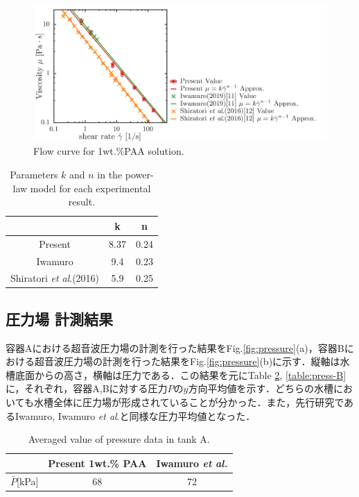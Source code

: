 \begin{figure}[ht]
    \centering
    \includegraphics[width=13cm,clip]{4-Results/PAA-viscosity.png}
    \caption{Flow curve for 1wt.\%PAA solution.}
    \label{fig:PAA-vis}
\end{figure}

\begin{table}[h]
    \centering
    \caption{Parameters $k$ and $n$ in the power-law model for each experimental result.}
    \label{table:power-law}
    \begin{tabular}{c|c|c} \hline
        & k & n \\ \hline \hline
        Present & 8.37 & 0.24 \\
        Iwamuro\cite{ref:8} & 9.4 & 0.23 \\
        Shiratori \textit{et al}.(2016)\cite{ref:10} & 5.9 & 0.25 \\ \hline
    \end{tabular}
\end{table}

\newpage

\subsection{圧力場 計測結果}

容器Aにおける超音波圧力場の計測を行った結果をFig.\ref{fig:pressure}(a)，容器Bにおける超音波圧力場の計測を行った結果をFig.\ref{fig:pressure}(b)に示す．縦軸は水槽底面からの高さ，横軸は圧力である．この結果を元にTable \ref{table:press-A}, \ref{table:press-B} に，それぞれ，容器A,Bに対する圧力$P$の$y$方向平均値を示す．どちらの水槽においても水槽全体に圧力場が形成されていることが分かった．また，先行研究であるIwamuro\cite{ref:8}, Iwamuro \textit{et al}.\cite{ref:9}と同様な圧力平均値となった．

\begin{table}[h]
    \centering
    \caption{Averaged value of pressure data in tank A.}
    \label{table:press-A}
    \begin{tabular}{c|c|c}\hline
                       & Present 1wt.\% PAA & Iwamuro {\it et al.}\cite{ref:8} \\ \hline
        $\bar{P}$[kPa] &       68        & 72                              \\ \hline
    \end{tabular}
\end{table}

